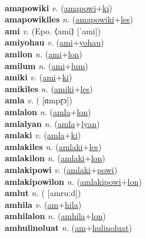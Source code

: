  \label{amapowinyolum} \\
\textbf{amapowiki} \textit{v.} (\hyperref[amapowi]{amapowi}+\hyperref[ki]{ki})
 \label{amapowiki} \\
\textbf{amapowikiles} \textit{n.} (\hyperref[amapowiki]{amapowiki}+\hyperref[les]{les})
 \label{amapowikiles} \\
\textbf{ami} \textit{v.} (Epo. ⟨ami⟩ [ˈami])
 \label{ami} \\
\textbf{amiyohau} \textit{v.} (\hyperref[ami]{ami}+\hyperref[yohau]{yohau})
 \label{amiyohau} \\
\textbf{amilon} \textit{n.} (\hyperref[ami]{ami}+\hyperref[lon]{lon})
 \label{amilon} \\
\textbf{amilum} \textit{n.} (\hyperref[ami]{ami}+\hyperref[lum]{lum})
 \label{amilum} \\
\textbf{amiki} \textit{v.} (\hyperref[ami]{ami}+\hyperref[ki]{ki})
 \label{amiki} \\
\textbf{amikiles} \textit{n.} (\hyperref[amiki]{amiki}+\hyperref[les]{les})
 \label{amikiles} \\
\textbf{amla} \textit{v.} ( [ɑmpɽɔ])
 \label{amla} \\
\textbf{amlalon} \textit{n.} (\hyperref[amla]{amla}+\hyperref[lon]{lon})
 \label{amlalon} \\
\textbf{amlalyan} \textit{n.} (\hyperref[amla]{amla}+\hyperref[lyan]{lyan})
 \label{amlalyan} \\
\textbf{amlaki} \textit{v.} (\hyperref[amla]{amla}+\hyperref[ki]{ki})
 \label{amlaki} \\
\textbf{amlakiles} \textit{n.} (\hyperref[amlaki]{amlaki}+\hyperref[les]{les})
 \label{amlakiles} \\
\textbf{amlakilon} \textit{n.} (\hyperref[amlaki]{amlaki}+\hyperref[lon]{lon})
 \label{amlakilon} \\
\textbf{amlakipowi} \textit{v.} (\hyperref[amlaki]{amlaki}+\hyperref[powi]{powi})
 \label{amlakipowi} \\
\textbf{amlakipowilon} \textit{n.} (\hyperref[amlakipowi]{amlakipowi}+\hyperref[lon]{lon})
 \label{amlakipowilon} \\
\textbf{amlut} \textit{n.} ( [amruːd])
 \label{amlut} \\
\textbf{amhila} \textit{v.} (\hyperref[am]{am}+\hyperref[hila]{hila})
 \label{amhila} \\
\textbf{amhilalon} \textit{n.} (\hyperref[amhila]{amhila}+\hyperref[lon]{lon})
 \label{amhilalon} \\
\textbf{amhulinoluat} \textit{n.} (\hyperref[am]{am}+\hyperref[hulinoluat]{hulinoluat})
